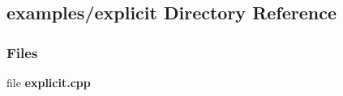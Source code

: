 \subsection{examples/explicit Directory Reference}
\label{dir_e31947a2dffd2faa80f31ee70be54c5b}
\subsubsection*{Files}
\begin{DoxyCompactItemize}
\item 
file {\bf explicit.\+cpp}
\end{DoxyCompactItemize}
